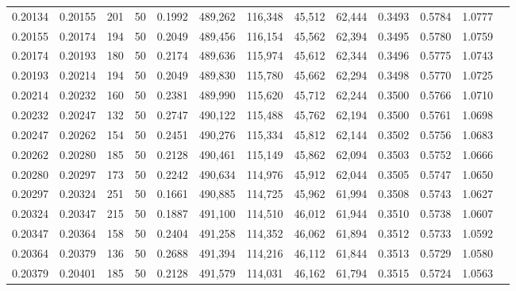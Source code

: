 \begin{tabular}{rrrrrrrrrrrrr}
0.20134 & 0.20155 &   201 &  50 &                                     0.1992 & 489,262 & 116,348 &  45,512 &  62,444 & 0.3493 & 0.5784 & 1.0777 \\
0.20155 & 0.20174 &   194 &  50 &                                     0.2049 & 489,456 & 116,154 &  45,562 &  62,394 & 0.3495 & 0.5780 & 1.0759 \\
0.20174 & 0.20193 &   180 &  50 &                                     0.2174 & 489,636 & 115,974 &  45,612 &  62,344 & 0.3496 & 0.5775 & 1.0743 \\
0.20193 & 0.20214 &   194 &  50 &                                     0.2049 & 489,830 & 115,780 &  45,662 &  62,294 & 0.3498 & 0.5770 & 1.0725 \\
0.20214 & 0.20232 &   160 &  50 &                                     0.2381 & 489,990 & 115,620 &  45,712 &  62,244 & 0.3500 & 0.5766 & 1.0710 \\
0.20232 & 0.20247 &   132 &  50 &                                     0.2747 & 490,122 & 115,488 &  45,762 &  62,194 & 0.3500 & 0.5761 & 1.0698 \\
0.20247 & 0.20262 &   154 &  50 &                                     0.2451 & 490,276 & 115,334 &  45,812 &  62,144 & 0.3502 & 0.5756 & 1.0683 \\
0.20262 & 0.20280 &   185 &  50 &                                     0.2128 & 490,461 & 115,149 &  45,862 &  62,094 & 0.3503 & 0.5752 & 1.0666 \\
0.20280 & 0.20297 &   173 &  50 &                                     0.2242 & 490,634 & 114,976 &  45,912 &  62,044 & 0.3505 & 0.5747 & 1.0650 \\
0.20297 & 0.20324 &   251 &  50 &                                     0.1661 & 490,885 & 114,725 &  45,962 &  61,994 & 0.3508 & 0.5743 & 1.0627 \\
0.20324 & 0.20347 &   215 &  50 &                                     0.1887 & 491,100 & 114,510 &  46,012 &  61,944 & 0.3510 & 0.5738 & 1.0607 \\
0.20347 & 0.20364 &   158 &  50 &                                     0.2404 & 491,258 & 114,352 &  46,062 &  61,894 & 0.3512 & 0.5733 & 1.0592 \\
0.20364 & 0.20379 &   136 &  50 &                                     0.2688 & 491,394 & 114,216 &  46,112 &  61,844 & 0.3513 & 0.5729 & 1.0580 \\
0.20379 & 0.20401 &   185 &  50 &                                     0.2128 & 491,579 & 114,031 &  46,162 &  61,794 & 0.3515 & 0.5724 & 1.0563 \\

\end{tabular}

